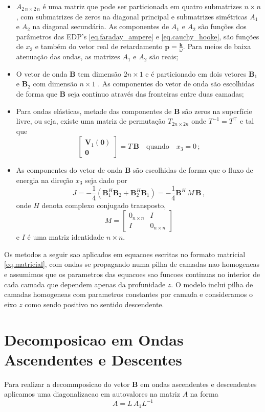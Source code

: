\begin{itemize}
\item $A_{2\,n\times2\,n}$ \'e uma matriz que pode ser particionada em quatro submatrizes $n\times n$, com submatrizes de zeros na diagonal principal e submatrizes sim\'etricas $A_1$ e $A_2$ na diagonal secund\'aria. As componentes de $A_1$ e $A_2$ s\~ao fun\c{c}\~oes dos par\^ametros das EDP's \ref{eq.faraday_ampere} e \ref{eq.cauchy_hooke}, s\~ao fun\c{c}\~oes de $x_3$ e tamb\'em do vetor real de retardamento $\mathbf{p}=\frac{\mathbf{k}}{\omega}$. Para meios de baixa atenua\c{c}\~ao das ondas, as matrizes $A_1$ e $A_2$ s\~ao reais; 
\item O vetor de onda $\mathbf{B}$ tem dimens\~ao $2n\times1$ e \'e particionado em dois vetores $\mathbf{B}_1$ e $\mathbf{B}_2$ com dimens\~ao $n\times1$ . As componentes do vetor de onda s\~ao escolhidas de forma que $\mathbf{B}$ seja cont\'inuo atrav\'es das fronteiras entre duas camadas;
\item  Para ondas el\'asticas, metade das componentes de $\mathbf{B}$ s\~ao zeros na superf\'icie livre, ou seja, existe uma matriz de permuta\c{c}\~ao $T_{2n\times2n}$ onde $T^{-1}=T^\top$ e tal que
\begin{equation}
\begin{bmatrix}
\mathbf{V}_1(\mathbf{0})\\
\mathbf{0}
\end{bmatrix}
=T\,\mathbf{B}\quad\text{quando}\quad x_3 = 0\,;
\end{equation}
\item As componentes do vetor de onda $\mathbf{B}$ s\~ao escolhidas de forma que o fluxo de energia na dire\c{c}\~ao $x_3$ seja dado por
\begin{equation}
J=-\frac{1}{4}(\mathbf{B}_1^H\mathbf{B}_2+\mathbf{B}_2^H\mathbf{B}_1)=-\frac{1}{4}\mathbf{B}^H\,M\, \mathbf{B}\,,
\end{equation}
onde $H$ denota complexo conjugado transposto,
\begin{equation}
M=
\begin{bmatrix}
0_{n\times n}&I\\
I&0_{n\times n}
\end{bmatrix}
\end{equation}
e $I$ \'e uma matriz identidade $n\times n$.
\end{itemize}

Os metodos a seguir sao aplicados em equacoes escritas no formato matricial \ref{eq.matricial}, com ondas se propagando numa pilha de camadas nao homogeneas e assumimos que os parametros das equacoes sao funcoes continuas no interior de cada camada que dependem apenas da profunidade $z$. O modelo inclui pilha de camadas homogeneas com parametros constantes por camada e consideramos o eixo $z$ como sendo positivo no sentido descendente.   

\section{Decomposicao em Ondas Ascendentes e Descentes}

Para realizar a decommposicao do vetor $\mathbf{B}$ em ondas ascendentes e descendentes aplicamos uma diagonalizacao em autovalores na matriz $A$ na forma
\begin{equation}
A=L\,A_1L^{-1}
\end{equation}



